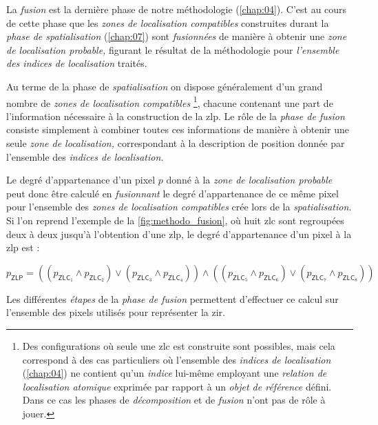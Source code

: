 La \emph{fusion} est la dernière phase de notre méthodologie
(\autoref{chap:04}). C'est au cours de cette phase que les \emph{zones
  de localisation compatibles} construites durant la \emph{phase de
  spatialisation} (\autoref{chap:07}) sont \emph{fusionnées} de
manière à obtenir une \emph{zone de localisation probable,} figurant
le résultat de la méthodologie pour \emph{l'ensemble des indices de
  localisation} traités.

Au terme de la phase de \emph{spatialisation} on dispose généralement
d'un grand nombre de \emph{zones de localisation compatibles}
\footnote{Des configurations où seule une \ac{zlc} est construite sont
  possibles, mais cela correspond à des cas particuliers où l'ensemble
  des \emph{indices de localisation} (\autoref{chap:04}) ne contient
  qu'un \emph{indice} lui-même employant une \emph{relation de
    localisation atomique} exprimée par rapport à un \emph{objet de
    référence} défini. Dans ce cas les phases de \emph{décomposition}
  et de \emph{fusion} n'ont pas de rôle à jouer.}, chacune contenant
une part de l'information nécessaire à la construction de la
\ac{zlp}. Le rôle de la \emph{phase de fusion} consiste simplement à
combiner toutes ces informations de manière à obtenir une seule
\emph{zone de localisation,} correspondant à la description de
position donnée par l'ensemble des \emph{indices de localisation.}





Le degré d'appartenance d'un pixel $p$ donné à la \emph{zone de
  localisation probable} peut donc être calculé en \emph{fusionnant}
le degré d'appartenance de ce même pixel pour l'ensemble des
\emph{zones de localisation compatibles} crée lors de la
\emph{spatialisation.} Si l'on reprend l'exemple de la
\autoref{fig:methodo_fusion}, où huit \ac{zlc} sont regroupées deux à
deux jusqu'à l'obtention d'une \ac{zlp}, le degré d'appartenance d'un
pixel à la \ac{zlp} est :

\begin{equation}
 p_{\mathsf{ZLP}} = \left((p_{\mathsf{ZLC}_1} \wedge
p_{\mathsf{ZLC}_2}) \vee (p_{\mathsf{ZLC}_3} \wedge
p_{\mathsf{ZLC}_4})\right) \wedge \left((p_{\mathsf{ZLC}_5} \wedge
p_{\mathsf{ZLC}_6}) \vee (p_{\mathsf{ZLC}_7} \wedge
p_{\mathsf{ZLC}_8})\right)
\end{equation}

Les différentes \emph{étapes} de la \emph{phase de fusion} permettent
d'effectuer ce calcul sur l'ensemble des pixels utilisés pour
représenter la \ac{zir}.


